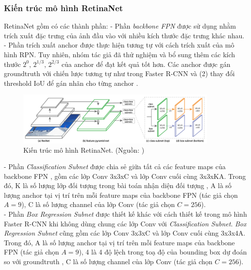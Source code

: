 {    \subsubsection*{Kiến trúc mô hình RetinaNet}
    RetinaNet  gồm có các thành phần:
    - Phần \textit{backbone FPN} được sử dụng nhằm trích xuất đặc trưng của ảnh đầu vào với nhiều kích thước đặc trưng khác nhau.
    - Phần trích xuất anchor  được thực hiện tương tự với cách trích xuất của mô hình RPN.
    Tuy nhiên, nhóm tác giả đã thử nghiệm và bổ sung thêm các kích thước $2^{0}$, $2^{1/3}$, $2^{2/3}$ của anchor  để đạt kết quả tốt hơn.
    Các anchor  được gán groundtruth  với chiến lược tương tự như trong Faster R-CNN  \cite{ren2015faster} và (2) thay đổi threshold IoU  để gán nhãn cho từng anchor .

    \begin{figure}[H]
        \centering
        \includegraphics[width=10cm] {images/retinanet_model}
        \caption{Kiến trúc mô hình RetinaNet. (Nguồn: \cite{lin2017focal})}
        \label{fig:retinanet_model}
    \end{figure}

    \noindent
    - Phần \textit{Classification Subnet} được chia sẻ giữa tất cả các feature maps  của backbone FPN , gồm các lớp Conv  3x3xC và lớp Conv  cuối cùng 3x3xKA.
    Trong đó, K là số lượng lớp đối tượng  trong bài toán nhận diện đối tượng , A là số lượng anchor  tại vị trí trên mỗi feature maps  của backbone FPN  (tác giả chọn $A = 9$), C là số lượng channel  của lớp Conv  (tác giả chọn $C = 256$). \\
    - Phần \textit{Box Regression Subnet} được thiết kế khác với cách thiết kế trong mô hình Faster R-CNN  \cite{ren2015faster} khi không dùng chung các lớp Conv  với \textit{Classification Subnet}.
    \textit{Box Regression Subnet} cũng gồm các lớp Conv  3x3xC và lớp Conv  cuối cùng 3x3x4A.
    Trong đó, A là số lượng anchor  tại vị trí trên mỗi feature maps của backbone FPN  (tác giả chọn $A = 9$), 4 là 4 độ lệch trong toạ độ của bounding box  dự đoán so với groundtruth , C là số lượng channel  của lớp Conv  (tác giả chọn $C = 256$).

}
